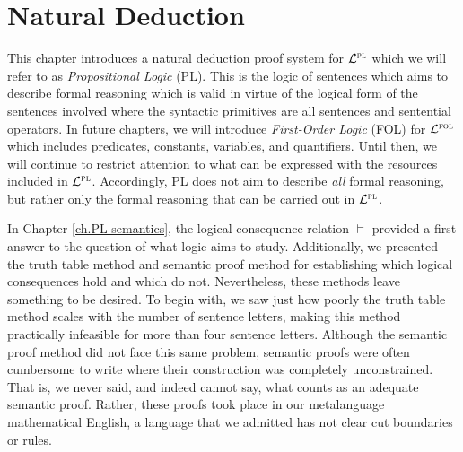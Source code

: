 \chapter{Natural Deduction}
\label{ch.ND.proofs}


This chapter introduces a natural deduction proof system for $\mathcal{L}^{\textsc{pl}}$ which we will refer to as \textit{Propositional Logic} (PL).
This is the logic of sentences which aims to describe formal reasoning which is valid in virtue of the logical form of the sentences involved where the syntactic primitives are all sentences and sentential operators.
In future chapters, we will introduce \textit{First-Order Logic} (FOL) for $\mathcal{L}^{\textsc{fol}}$ which includes predicates, constants, variables, and quantifiers. 
Until then, we will continue to restrict attention to what can be expressed with the resources included in $\mathcal{L}^{\textsc{pl}}$.
Accordingly, PL does not aim to describe \textit{all} formal reasoning, but rather only the formal reasoning that can be carried out in $\mathcal{L}^{\textsc{pl}}$.

In Chapter \ref{ch.PL-semantics}, the logical consequence relation $\vDash$ provided a first answer to the question of what logic aims to study.
Additionally, we presented the truth table method and semantic proof method for establishing which logical consequences hold and which do not.
Nevertheless, these methods leave something to be desired.
To begin with, we saw just how poorly the truth table method scales with the number of sentence letters, making this method practically infeasible for more than four sentence letters.
Although the semantic proof method did not face this same problem, semantic proofs were often cumbersome to write where their construction was completely unconstrained.
That is, we never said, and indeed cannot say, what counts as an adequate semantic proof.
Rather, these proofs took place in our metalanguage mathematical English, a language that we admitted has not clear cut boundaries or rules.


